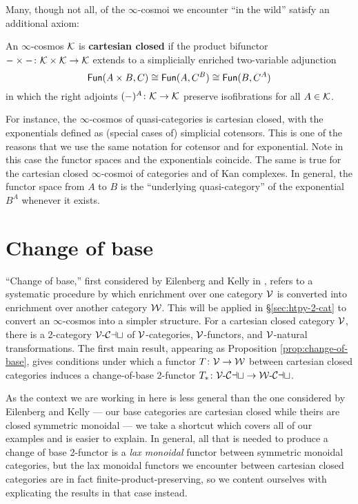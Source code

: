 Many, though not all, of the $\infty$-cosmoi we encounter ``in the wild'' satisfy an additional axiom:

\begin{defn}\label{defn:closed-cosmos} An $\infty$-cosmos ${\mathord{\mathcal{K}}}$ is \textbf{cartesian closed} if the product bifunctor
$- \times -\colon {\mathord{\mathcal{K}}} \times {\mathord{\mathcal{K}}} \to {\mathord{\mathcal{K}}}$ extends to a simplicially enriched two-variable adjunction
\[ {\mathord{\mathsf{Fun}}}(A \times B,C) \cong {\mathord{\mathsf{Fun}}}(A,C^B) \cong {\mathord{\mathsf{Fun}}}(B,C^A)\]
in which the right adjoints $(-)^A \colon {\mathord{\mathcal{K}}} \to {\mathord{\mathcal{K}}}$ preserve isofibrations for all $A \in {\mathord{\mathcal{K}}}$.
\end{defn}

For instance, the $\infty$-cosmos of quasi-categories is cartesian closed, with the exponentials defined as (special cases of) simplicial cotensors. This is one of the reasons that we use the same notation for cotensor and for exponential. Note in this case the functor spaces and the exponentials coincide. The same is true for the cartesian closed $\infty$-cosmoi of categories and of Kan complexes. In general, the functor space from $A$ to $B$ is the ``underlying quasi-category'' of the exponential $B^A$ whenever it exists. %

\section{Change of base}\label{sec:change-of-base}

``Change of base,'' first considered by Eilenberg and Kelly in \cite{EilenbergKelly:1966cc}, refers to a systematic procedure by which enrichment over one category ${\mathord{\mathcal{V}}}$ is converted into enrichment over another category ${\mathord{\mathcal{W}}}$.  This will be applied in \S\ref{sec:htpy-2-cat} to convert an $\infty$-cosmos into a simpler structure.
 For a cartesian closed category ${\mathord{\mathcal{V}}}$, there is a 2-category ${{\mathord{\mathcal{V}}}}\text{-}{\mathord{\mathcal{Cat}}}$ of ${\mathord{\mathcal{V}}}$-categories, ${\mathord{\mathcal{V}}}$-functors, and ${\mathord{\mathcal{V}}}$-natural transformations. The first main result, appearing as Proposition \ref{prop:change-of-base}, gives conditions under which a functor $T \colon {\mathord{\mathcal{V}}} \to {\mathord{\mathcal{W}}}$ between cartesian closed categories induces a change-of-base 2-functor $T_* \colon {{\mathord{\mathcal{V}}}}\text{-}{\mathord{\mathcal{Cat}}} \to {{\mathord{\mathcal{W}}}}\text{-}{\mathord{\mathcal{Cat}}}$.

As the context we are working in here is less general than the one considered by Eilenberg and Kelly --- our base categories are cartesian closed while theirs are closed symmetric monoidal --- we take a shortcut which covers all of our examples and is easier to explain.  In general, all that is needed to produce a change of base 2-functor is a \emph{lax monoidal} functor between symmetric monoidal categories, but the lax monoidal functors we encounter between cartesian closed categories are in fact finite-product-preserving, so we content ourselves with explicating the results in that case instead.

